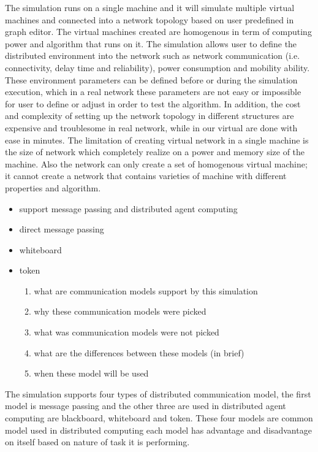 The simulation runs on a single machine and it will simulate multiple virtual machines and connected into a network topology based on user predefined in graph editor. The virtual machines created are homogenous in term of computing power and algorithm that runs on it. The simulation allows user to define the distributed environment into the network such as network communication (i.e. connectivity, delay time and reliability), power consumption and mobility ability. These environment parameters can be defined before or during the simulation execution, which in a real network these parameters are not easy or impossible for user to define or adjust in order to test the algorithm. In addition, the cost and complexity of setting up the network topology in different structures are expensive and troublesome in real network, while in our virtual are done with ease in minutes.
The limitation of creating virtual network in a single machine is the size of network which completely realize on a power and memory size of the machine. Also the network can only create a set of homogenous virtual machine; it cannot create a network that contains varieties of machine with different properties and algorithm.

\begin{itemize}
\item support message passing and distributed agent computing
\item direct message passing
\item whiteboard
\item token
    \begin{enumerate}
    \item what are communication models support by this simulation
    \item why these communication models were picked
    \item what was communication models were not picked
    \item what are the differences between these models (in brief)
    \item when these model will be used
    \end{enumerate}
\end{itemize}

The simulation supports four types of distributed communication model, the first model is message passing and the other three are used in distributed agent computing are blackboard, whiteboard and token. These four models are common model used in distributed computing each model has advantage and disadvantage on itself based on nature of task it is performing.

